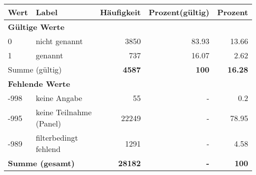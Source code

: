      \begin{longtable}{lXrrr}
     \toprule
     \textbf{Wert} & \textbf{Label} & \textbf{Häufigkeit} & \textbf{Prozent(gültig)} & \textbf{Prozent} \\
     \endhead
     \midrule
     \multicolumn{5}{l}{\textbf{Gültige Werte}}\\

     0 &
     \multicolumn{1}{X}{ nicht genannt   } &


       \num{3850} &
       \num[round-mode=places,round-precision=2]{83.93} &
         \num[round-mode=places,round-precision=2]{13.66} \\

     1 &
     \multicolumn{1}{X}{ genannt   } &


       \num{737} &
       \num[round-mode=places,round-precision=2]{16.07} &
         \num[round-mode=places,round-precision=2]{2.62} \\
     \midrule
     \multicolumn{2}{l}{Summe (gültig)} &
       \textbf{\num{4587}} &
     \textbf{100} &
       \textbf{\num[round-mode=places,round-precision=2]{16.28}} \\
     \multicolumn{5}{l}{\textbf{Fehlende Werte}}\\
       -998 &
       keine Angabe &
         \num{55} &
        - &
         \num[round-mode=places,round-precision=2]{0.2} \\
       -995 &
       keine Teilnahme (Panel) &
         \num{22249} &
        - &
         \num[round-mode=places,round-precision=2]{78.95} \\
       -989 &
       filterbedingt fehlend &
         \num{1291} &
        - &
         \num[round-mode=places,round-precision=2]{4.58} \\
     \midrule
     \multicolumn{2}{l}{\textbf{Summe (gesamt)}} &
          \textbf{\num{28182}} &
        \textbf{-} &
        \textbf{100} \\
     \bottomrule
     \end{longtable}
     
